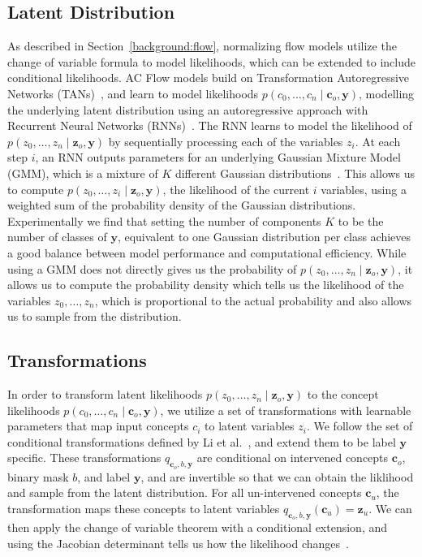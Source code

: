 \subsection{Latent Distribution}

As described in Section~\ref{background:flow}, 
normalizing flow models utilize the change of variable formula to model likelihoods,
which can be extended to include conditional likelihoods. AC Flow models build on
Transformation Autoregressive
Networks (TANs)~\cite{tans}, and learn to model 
likelihoods $p(c_0,\ldots, c_n \mid \mathbf{c}_o ,\mathbf{y})$,
modelling the underlying latent distribution using an autoregressive approach with Recurrent
Neural Networks (RNNs)~\cite{rnn}. The RNN learns to model the likelihood of 
$p(z_0, \ldots, z_n \mid \mathbf{z}_o , \mathbf{y})$ by sequentially processing each of the variables
 $z_i$.
At each step $i$, an RNN outputs parameters for an underlying Gaussian Mixture Model (GMM),
which is a mixture of $K$ different Gaussian distributions~\cite{gmm}.
This allows us to compute $p(z_0, \ldots, z_i \mid \mathbf{z}_o , \mathbf{y})$,
the likelihood of the current $i$ variables,
using a weighted
sum of the probability density of the Gaussian distributions. Experimentally
we find that setting the number of components $K$ to be the number of classes of
$\mathbf{y}$, equivalent to one Gaussian distribution per 
class 
achieves
a good balance between model performance and computational efficiency.
While using a GMM does not directly gives us the probability of
$p(z_0, \ldots, z_n \mid \mathbf{z}_o , \mathbf{y})$, 
it allows us to compute the probability density which tells us the likelihood of the
 variables $z_0, \ldots, z_n$, which is proportional
 to the actual probability and also allows us to sample from the distribution.

\subsection{Transformations}
In order to transform latent likelihoods $p(z_0, \ldots, z_n \mid \mathbf{z}_o , \mathbf{y})$ to 
the concept likelihoods
$p(c_0,\ldots, c_n \mid \mathbf{c}_o , \mathbf{y})$, we
utilize a set of transformations with learnable parameters that 
map input concepts $c_i$ to latent variables $z_i$. We follow the 
set of conditional transformations defined by Li et al.~\cite{acflow}, and extend them to
be label $\mathbf{y}$ specific.
These transformations $q_{\mathbf{c}_o, b, \mathbf{y}}$ are
conditional on 
intervened concepts $\mathbf{c}_o$, binary mask $b$, and label $\mathbf{y}$, 
and are invertible so that we can obtain the liklihood and 
sample from the latent distribution. 
For all un-intervened concepts $\mathbf{c}_u$,
the transformation maps these concepts to latent variables $q_{\mathbf{c}_o, b, \mathbf{y}}(\mathbf{c}_u) = \mathbf{z}_u$. 
We can then apply the change
of variable theorem with a conditional extension, and using
the Jacobian determinant tells us how the likelihood changes~\cite{normalizing-flows}.

